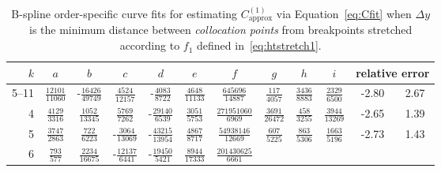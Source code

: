 \begin{sidewaystable}
\centering
\caption[
    B-spline order-specific curve fits for $C_\text{approx}^{(1)}$
    for stretching~\eqref{eq:htstretch1}.
]{%
    B-spline order-specific curve fits for estimating $C_\text{approx}^{(1)}$
    via Equation~\eqref{eq:Cfit} when $\Delta{}y$ is the minimum distance
    between \emph{collocation points} from breakpoints stretched according
    to $f_1$ defined in~\eqref{eq:htstretch1}.
}
\label{tab:C1fit1}
\vspace{1em}
\renewcommand{\arraystretch}{1.40}   %
\begin{tabular}{r|ccccccccc|c@{ -- }c@{\%}}
 $k$ & $a$ & $b$ & $c$ & $d$ & $e$ & $f$ & $g$ & $h$ & $i$
     & \multicolumn{2}{c}{relative error}
\\ \hline
5--11
&  $\frac{           12101}{           11060}$
& -$\frac{           16426}{           49749}$
&  $\frac{            4524}{           12157}$
& -$\frac{            4083}{            8722}$
&  $\frac{            4648}{           11133}$
&  $\frac{          645696}{           14887}$
&  $\frac{             117}{            4057}$
&  $\frac{            3436}{            8883}$
&  $\frac{            2329}{            6500}$
&  -2.80 &  2.67
\\
4
&  $\frac{            4129}{            3316}$
&  $\frac{            1052}{           13345}$
&  $\frac{            5769}{            7262}$
& -$\frac{           29140}{            6539}$
&  $\frac{            3051}{            5753}$
&  $\frac{       271951060}{            6969}$
&  $\frac{            3691}{           26472}$
&  $\frac{             458}{            3255}$
&  $\frac{            3944}{           13269}$
&  -2.65 &  1.39
\\
5
&  $\frac{            3747}{            2863}$
&  $\frac{             722}{            6223}$
& -$\frac{            3064}{           13069}$
& -$\frac{           43215}{           13954}$
&  $\frac{            4867}{            8717}$
&  $\frac{        54938146}{           12669}$
&  $\frac{             607}{            5225}$
&  $\frac{             863}{            5306}$
&  $\frac{            1663}{            5196}$
&  -2.73 &  1.43
\\
6
&  $\frac{             793}{             577}$
&  $\frac{            2234}{           16675}$
& -$\frac{           12137}{            6441}$
& -$\frac{           19450}{            5421}$
&  $\frac{            8944}{           17333}$
&  $\frac{       201430625}{            6661}$

\end{tabular}
\end{sidewaystable}
